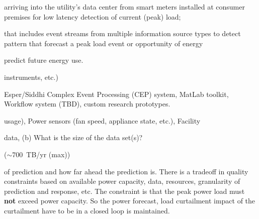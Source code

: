 \documentclass[times]{cpeauth}
\begin{document}
arriving into the utility's data center from smart meters installed at %
consumer premises for low latency detection of current (peak) load;

that includes event streams from multiple information source types to detect %
pattern that forecast a peak load event or opportunity of energy %

predict future energy use.

instruments, etc.)



Esper/Siddhi Complex Event Processing (CEP) system, MatLab toolkit, Workflow %
system (TBD), custom research prototypes.

usage), Power sensors (fan speed, %
appliance state, etc.), Facility %

data, (b) What is the size of the data set(s)?


($\sim$700~TB/yr (max))









of prediction and how far ahead the prediction is. There is a tradeoff in %
quality constraints based on available power capacity, data, %
resources, granularity of prediction and response, etc. The %
constraint is that the peak power load must {\bf not} exceed %
power capacity. So the power forecast, load curtailment %
impact of the curtailment have to be in a closed loop %
is maintained.
\end{document}
